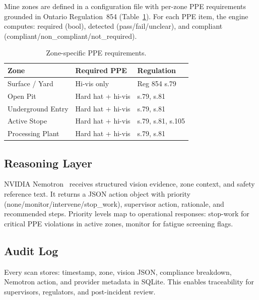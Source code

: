 Mine zones are defined in a configuration file with per-zone PPE requirements grounded in Ontario Regulation~854 (Table~\ref{tab:zones}). For each PPE item, the engine computes: required (bool), detected (pass/fail/unclear), and compliant (compliant/non\_compliant/not\_required).

\begin{table}[htbp]
  \centering
  \caption{Zone-specific PPE requirements.}
  \label{tab:zones}
  \begin{tabular}{@{}lll@{}}
    \toprule
    Zone & Required PPE & Regulation \\
    \midrule
    Surface / Yard & Hi-vis only & Reg 854 s.79 \\
    Open Pit & Hard hat + hi-vis & s.79, s.81 \\
    Underground Entry & Hard hat + hi-vis & s.79, s.81 \\
    Active Stope & Hard hat + hi-vis & s.79, s.81, s.105 \\
    Processing Plant & Hard hat + hi-vis & s.79, s.81 \\
    \bottomrule
  \end{tabular}
\end{table}

\subsection{Reasoning Layer}

NVIDIA Nemotron~\cite{nemotron2024} receives structured vision evidence, zone context, and safety reference text. It returns a JSON action object with priority (none/monitor/intervene/stop\_work), supervisor action, rationale, and recommended steps. Priority levels map to operational responses: stop-work for critical PPE violations in active zones, monitor for fatigue screening flags.

\subsection{Audit Log}

Every scan stores: timestamp, zone, vision JSON, compliance breakdown, Nemotron action, and provider metadata in SQLite. This enables traceability for supervisors, regulators, and post-incident review.
